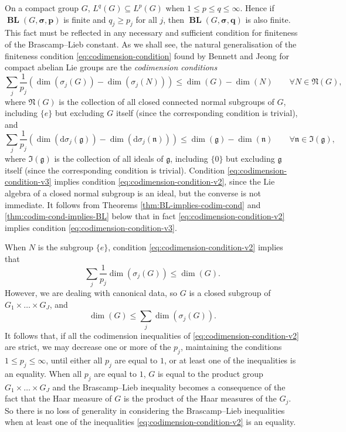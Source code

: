 \documentclass[12pt,twoside,a4paper]{amsart}
\theoremstyle{definition}
\theoremstyle{remark}
\numberwithin{equation}{section}
\newcommand{\Lie}[1]{\mathfrak{#1}}
\newcommand{\BL}{\operatorname{\mathbf{BL}}}
\newcommand{\bss}{\boldsymbol{\sigma}}
\newcommand{\bsp}{\boldsymbol{p}}
\newcommand{\bsq}{\boldsymbol{q}}
\newcommand{\lpar}{\left( }
\newcommand{\rpar}{\right) }
\begin{document}
On a compact group $G$, $L^q(G) \subseteq L^p(G)$ when $1 \leq p \leq q \leq \infty$.
Hence if $\BL(G,\bss,\bsp)$ is finite and $q_j \geq p_j$ for all $j$, then $\BL(G,\bss,\bsq)$ is also finite.
This fact must be reflected in any necessary and sufficient condition for finiteness of the Brascamp--Lieb constant.
As we shall see, the natural generalisation of the finiteness condition \eqref{eq:codimension-condition} found by Bennett and Jeong for compact abelian Lie groups are the \emph{codimension conditions}
\begin{equation}\label{eq:codimension-condition-v2}
\sum_j \frac{1}{p_j} \lpar \dim(\sigma_j(G))  - \dim( \sigma_j (N) ) \rpar  \leq \dim(G) - \dim(N) 
\qquad\forall N \in \Lie{N}(G),
\end{equation}
where $\Lie{N}(G)$ is the collection of all closed connected normal subgroups of $G$, including $\{e\}$ but excluding $G$ itself (since the corresponding condition is trivial), and 
\begin{equation}\label{eq:codimension-condition-v3}
\sum_j \frac{1}{p_j} \lpar \dim(\mathrm{d}\sigma_j(\Lie{g}))  - \dim( \mathrm{d}\sigma_j (\Lie{n}) ) \rpar  
\leq \dim(\Lie{g}) - \dim(\Lie{n}) 
\qquad\forall \Lie{n} \in \Lie{I}(\Lie{g}),
\end{equation}
where $\Lie{I}(\Lie{g})$ is the collection of all ideals of $\Lie{g}$, including $\{0\}$ but excluding $\Lie{g}$ itself (since the corresponding condition is trivial).
Condition \eqref{eq:codimension-condition-v3} implies condition \eqref{eq:codimension-condition-v2}, since the Lie algebra of a closed normal subgroup is an ideal, but the converse is not immediate.
It follows from Theorems \ref{thm:BL-implies-codim-cond} and \ref{thm:codim-cond-implies-BL} below that in fact \eqref{eq:codimension-condition-v2} implies condition \eqref{eq:codimension-condition-v3}.

When $N$ is the subgroup $\{e\}$, condition \eqref{eq:codimension-condition-v2} implies that
\begin{equation*}
\sum_j \frac{1}{p_j} \dim(\sigma_j(G))   \leq \dim(G)  .
\end{equation*}
However, we are dealing with canonical data, so $G$ is a closed subgroup of $G_1 \times \dots \times G_J$, and 
\begin{equation*}
\dim(G)  \leq \sum_j \dim(\sigma_j(G)) .
\end{equation*}
It follows that, if all the codimension inequalities of \eqref{eq:codimension-condition-v2} are strict, we may decrease one or more of the $p_j$, maintaining the conditions $1\leq p_j \leq \infty$, until either all $p_j$ are equal to $1$, or at least one of the inequalities is an equality.
When all $p_j$ are equal to $1$, $G$ is equal to the product group $G_1 \times \dots \times G_J$ and the Brascamp--Lieb inequality becomes a consequence of the fact that the Haar measure of $G$ is the product of the Haar measures of the $G_j$.
So there is no loss of generality in considering the Brascamp--Lieb inequalities when at least one of the inequalities \eqref{eq:codimension-condition-v2} is an equality.
\end{document}
